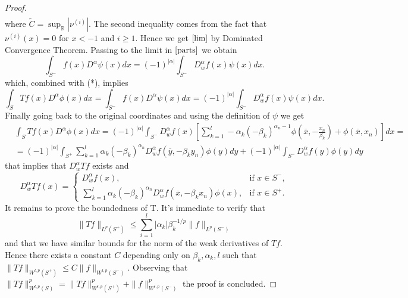 \documentclass[12pt]{article}
\theoremstyle{definition}
\begin{document}
\begin{proof}
\begin{align*}
\end{align*}
where $\widetilde C = \sup_\mathbb{R} |\nu^{(i)}|$. The second inequality comes from the fact that $\nu^{(i)}(x)=0$ for $x<-1$ and $i\ge 1$. Hence we get $\eqref{lim}$ by Dominated Convergence Theorem. Passing to the limit in $\eqref{parts}$ we obtain
\[ \int_{S^-}  f(x)D^{\alpha}\psi(x) dx = (-1)^{|\alpha|}\int_{S^-} D^\alpha_wf(x)\psi(x)  dx.  \]
which, combined with (*), implies
\[ \int_S Tf(x)D^{\alpha}\phi(x)dx=  \int_{S^-}  f(x)D^{\alpha}\psi(x) dx = (-1)^{|\alpha|}\int_{S^-} D^\alpha_wf(x)\psi(x)  dx. \]
Finally going back to the original coordinates and using the definition of $\psi$ we get
\begin{align*}
& \int_S Tf(x)D^{\alpha}\phi(x)dx = (-1)^{|\alpha|} \int_{S^-}D^\alpha_w f(x) \left[\sum_{k=1}^l -\alpha_k (-\beta_k)^{\alpha_n-1}\phi \left( \overline x,-\frac{x_n}{\beta_k} \right)+\phi(\overline x,x_n)\right] dx=\\
					&= (-1)^{|\alpha|} \int_{S^+} \sum_{k=1}^l \alpha_k (-\beta_k)^{\alpha_n} D^\alpha_w f(\overline y,-\beta_k y_n)\phi(y)dy +(-1)^{|\alpha|} \int_{S^-} D^\alpha_w f(y)\phi(y) dy
\end{align*}
that implies that $D^\alpha_wTf$ exists and 
\[ D^\alpha_wTf(x)= \begin{cases}
			 D^\alpha_w f(x),	& \text{if } x \in S^-, \\
			\sum_{k=1}^l \alpha_k (-\beta_k)^{\alpha_n} D^\alpha_w f(\overline x,-\beta_k x_n)\phi(x), & \text{if }x \in S^+.
		\end{cases}
 \]
It remains to prove the boundedness of  T. It's immediate to verify that
\[ \| Tf \|_{L^p(S^+)}\le \sum_{i=1}^l |\alpha_k|\beta_k^{-1/p} \| f\|_{L^p(S^-)} \] 
and that we have similar bounds for the norm of the weak derivatives of $Tf$. Hence there exists a constant $C$ depending only on $\beta_k,\alpha_k,l$ such that $\| Tf\|_{W^{l,p}(S^+)}\le C \| f\|_{W^{l,p}(S^-)} $. Observing that $\| Tf\|^p_{W^{l,p}(S)}=\| Tf\|^p_{W^{l,p}(S^+)}+\|f\|^p_{W^{l,p}(S^-)}$ the proof is concluded.
\end{proof}
\end{document}
